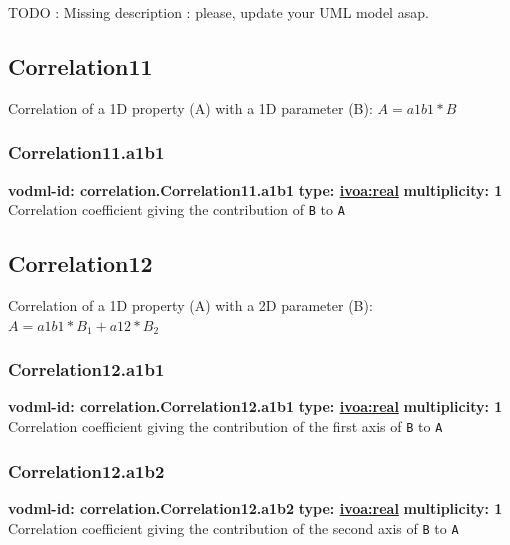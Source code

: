 
  TODO : Missing description : please, update your UML model asap.

  \subsection{Correlation11}
  \label{sect:correlation.Correlation11}
    Correlation of a 1D property (A) with a 1D parameter (B): $A = a1b1 * B$

    \subsubsection{Correlation11.a1b1}
      \textbf{vodml-id: correlation.Correlation11.a1b1} \newline
      \textbf{type: \hyperref[sect:ivoa]{ivoa:real}} \newline
      \textbf{multiplicity: 1} \newline 
      Correlation coefficient giving the contribution of \texttt{B} to \texttt{A}

  \subsection{Correlation12}
  \label{sect:correlation.Correlation12}
    Correlation of a 1D property (A) with a 2D parameter (B): $A = a1b1 * B_1 + a12 * B_2$

    \subsubsection{Correlation12.a1b1}
      \textbf{vodml-id: correlation.Correlation12.a1b1} \newline
      \textbf{type: \hyperref[sect:ivoa]{ivoa:real}} \newline
      \textbf{multiplicity: 1} \newline 
      Correlation coefficient giving the contribution of the first axis of \texttt{B} to \texttt{A}

    \subsubsection{Correlation12.a1b2}
      \textbf{vodml-id: correlation.Correlation12.a1b2} \newline
      \textbf{type: \hyperref[sect:ivoa]{ivoa:real}} \newline
      \textbf{multiplicity: 1} \newline 
      Correlation coefficient giving the contribution of the second axis of \texttt{B} to \texttt{A}

